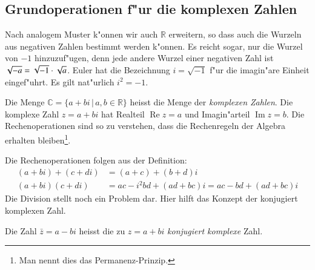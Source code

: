 \subsection{Grundoperationen f"ur die komplexen Zahlen}
Nach analogem Muster k"onnen wir auch $\mathbb R$ erweitern, so dass auch
die Wurzeln aus negativen Zahlen bestimmt werden k"onnen. Es reicht
sogar, nur die Wurzel von $-1$ hinzuzuf"ugen, denn jede andere Wurzel
einer negativen Zahl ist $\sqrt{-a}=\sqrt{-1}\cdot\sqrt{\mathstrut a}$.
Euler hat die Bezeichnung $i=\sqrt{-1}$ f"ur die imagin"are Einheit eingef"uhrt.
Es gilt nat"urlich $i^2=-1$.

\begin{definition}
Die Menge $\mathbb C=\{a+bi\,|\,a,b\in\mathbb R\}$ heisst die Menge der
%
%
{\em komplexen Zahlen}. Die komplexe Zahl $z=a+bi$ hat
Realteil $\operatorname{Re}z=a$ und Imagin"arteil $\operatorname{Im}z=b$.
%
%
%
%
Die Rechenoperationen sind so zu verstehen, dass die Rechenregeln
der Algebra erhalten bleiben\footnote{Man nennt dies das Permanenz-Prinzip.}.
\end{definition}

Die Rechenoperationen folgen aus der Definition:
\begin{align*}
(a+bi)+(c+di)&=(a+c)+(b+d)i\\
(a+bi)(c+di)&=ac-i^2bd+(ad+bc)i=ac-bd+(ad+bc)i
\end{align*}
Die Division stellt noch ein Problem dar. Hier hilft das Konzept der
konjugiert komplexen Zahl.
%

\begin{definition}
Die Zahl $\bar z=a-bi$ heisst die zu $z=a+bi$ {\em konjugiert komplexe} Zahl.
\end{definition}

